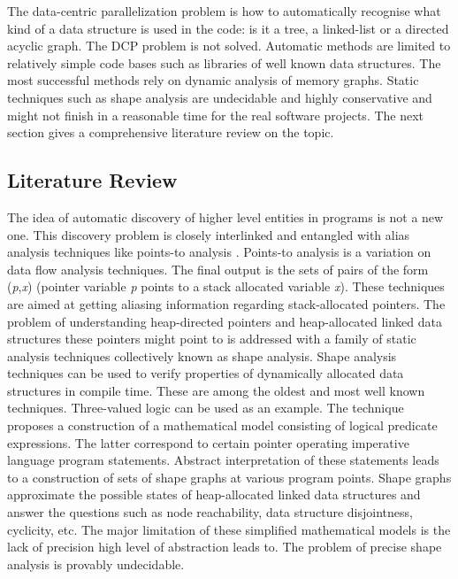 \quad The data-centric parallelization problem is how to automatically recognise what kind of a data structure is used in the code: is it a tree, a linked-list or a directed acyclic graph. The DCP problem is not solved. Automatic methods are limited to relatively simple code bases such as libraries of well known data structures. The most successful methods rely on dynamic analysis of memory graphs. Static techniques such as shape analysis are undecidable and highly conservative and might not finish in a reasonable time for the real software projects. The next section gives a comprehensive literature review on the topic.
\subsection{Literature Review}
\label{background_dcp_literature_review}
\quad The idea of automatic discovery of higher level entities in programs is not a new one. This discovery problem is closely interlinked and entangled with alias analysis techniques \cite{Muchnick:1998:ACD:286076} like points-to analysis \cite{Emami:1994:CIP:178243.178264}. Points-to analysis is a variation on data flow analysis techniques. The final output is the sets of pairs of the form (\textit{p},\textit{x}) (pointer variable \textit{p} points to a stack allocated variable \textit{x}). These techniques are aimed at getting aliasing information regarding stack-allocated pointers.\newline\null
\quad The problem of understanding heap-directed pointers and heap-allocated linked data structures these pointers might point to is addressed with a family of static analysis techniques collectively known as shape analysis. Shape analysis techniques can be used to verify properties of dynamically allocated data structures in compile time. These are among the oldest and most well known techniques. Three-valued logic \cite{Sagiv:1999:PSA:292540.292552}\cite{Wilhelm:2000:SA:647476.760384} can be used as an example. The technique proposes a construction of a mathematical model consisting of logical predicate expressions. The latter correspond to certain pointer operating imperative language program statements. Abstract interpretation of these statements leads to a construction of sets of shape graphs at various program points. Shape graphs approximate the possible states of heap-allocated linked data structures and answer the questions such as node reachability, data structure disjointness, cyclicity, etc. The major limitation of these simplified mathematical models is the lack of precision high level of abstraction leads to. The problem of precise shape analysis is provably undecidable.\newline\null
